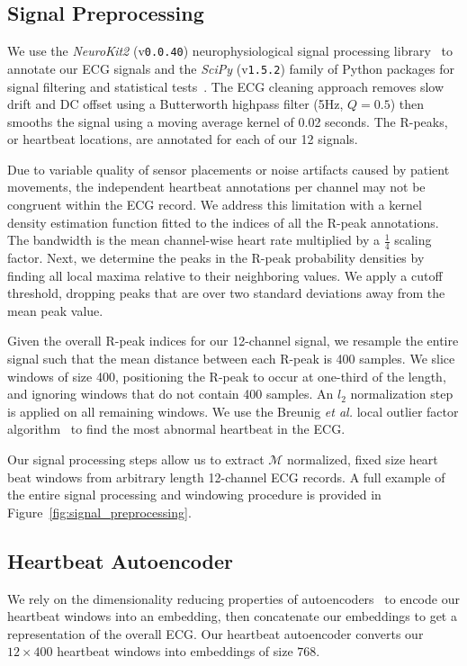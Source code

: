 \documentclass[\main/thesis.tex]{subfiles}
\begin{document}
\subsection{Signal Preprocessing}

We use the \emph{NeuroKit2} (v\texttt{0.0.40}) neurophysiological signal processing library~\cite{neurokit2} to annotate our ECG signals and the \emph{SciPy} (v\texttt{1.5.2}) family of Python packages for signal filtering and statistical tests~\cite{2020SciPy-NMeth}.
The ECG cleaning approach removes slow drift and DC offset using a Butterworth highpass filter (5Hz, $Q=0.5$) then smooths the signal using a moving average kernel of 0.02 seconds.
The R-peaks, or heartbeat locations, are annotated for each of our 12 signals.

Due to variable quality of sensor placements or noise artifacts caused by patient movements, the independent heartbeat annotations per channel may not be congruent within the ECG record.
We address this limitation with a kernel density estimation function fitted to the indices of all the R-peak annotations.
The bandwidth is the mean channel-wise heart rate multiplied by a $\frac{1}{4}$ scaling factor.
Next, we determine the peaks in the R-peak probability densities by finding all local maxima relative to their neighboring values.
We apply a cutoff threshold, dropping peaks that are over two standard deviations away from the mean peak value.

Given the overall R-peak indices for our 12-channel signal, we resample the entire signal such that the mean distance between each R-peak is 400 samples.
We slice windows of size 400, positioning the R-peak to occur at one-third of the length, and ignoring windows that do not contain 400 samples.
An $l_2$ normalization step is applied on all remaining windows.
We use the Breunig \emph{et al.} local outlier factor algorithm~\cite{10.1145/335191.335388} to find the most abnormal heartbeat in the ECG.

Our signal processing steps allow us to extract $\mathcal{M}$ normalized, fixed size heart beat windows from arbitrary length 12-channel ECG records.
A full example of the entire signal processing and windowing procedure is provided in Figure~\ref{fig:signal_preprocessing}.

\subsection{Heartbeat Autoencoder}

We rely on the dimensionality reducing properties of autoencoders~\cite{hinton2006reducing} to encode our heartbeat windows into an embedding, then concatenate our embeddings to get a representation of the overall ECG.
Our heartbeat autoencoder converts our $12\times 400$ heartbeat windows into embeddings of size $768$.
\end{document}
